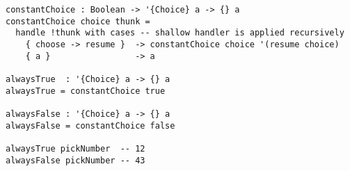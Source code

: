 \begin{algorithm}

\begin{verbatim}
constantChoice : Boolean -> '{Choice} a -> {} a
constantChoice choice thunk =
  handle !thunk with cases -- shallow handler is applied recursively
    { choose -> resume }  -> constantChoice choice '(resume choice)
    { a }                 -> a

alwaysTrue  : '{Choice} a -> {} a
alwaysTrue = constantChoice true

alwaysFalse : '{Choice} a -> {} a
alwaysFalse = constantChoice false
    
alwaysTrue pickNumber  -- 12
alwaysFalse pickNumber -- 43
\end{verbatim}

\caption{Effect handlers for Choice that always result in constant value. %
\label{alg-eff:choice-constant}}
\end{algorithm}
\endinput